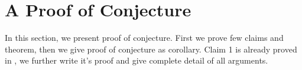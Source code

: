 \documentclass[12pt, a4paper]{report}
\begin{document}
\begin{abstract}
\end{abstract}



%


\chapter{A Proof of Conjecture}
\label{con_proof}
In this section, we present proof of conjecture. First we prove few claims and theorem, then we give proof of conjecture as corollary. Claim 1 is already proved in \cite{Sudhir_standard_style}, we further write it's proof and give complete detail of all arguments. %
\end{document}
